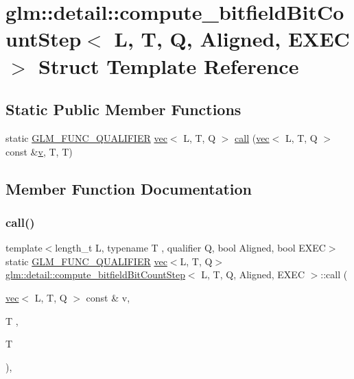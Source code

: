 \hypertarget{structglm_1_1detail_1_1compute__bitfield_bit_count_step}{}\section{glm\+:\+:detail\+:\+:compute\+\_\+bitfield\+Bit\+Count\+Step$<$ L, T, Q, Aligned, E\+X\+EC $>$ Struct Template Reference}
\label{structglm_1_1detail_1_1compute__bitfield_bit_count_step}
\subsection*{Static Public Member Functions}
\begin{DoxyCompactItemize}
\item 
static \hyperlink{setup_8hpp_a33fdea6f91c5f834105f7415e2a64407}{G\+L\+M\+\_\+\+F\+U\+N\+C\+\_\+\+Q\+U\+A\+L\+I\+F\+I\+ER} \hyperlink{structglm_1_1vec}{vec}$<$ L, T, Q $>$ \hyperlink{structglm_1_1detail_1_1compute__bitfield_bit_count_step_a6dd989f9de4e8dbe2af6cf3cae352778}{call} (\hyperlink{structglm_1_1vec}{vec}$<$ L, T, Q $>$ const \&\hyperlink{_s_d_l__opengl_8h_a10a82eabcb59d2fcd74acee063775f90}{v}, T, T)
\end{DoxyCompactItemize}


\subsection{Member Function Documentation}
\mbox{\label{structglm_1_1detail_1_1compute__bitfield_bit_count_step_a6dd989f9de4e8dbe2af6cf3cae352778}} 
\subsubsection{\texorpdfstring{call()}{call()}}
{\footnotesize\ttfamily template$<$length\+\_\+t L, typename T , qualifier Q, bool Aligned, bool E\+X\+EC$>$ \\
static \hyperlink{setup_8hpp_a33fdea6f91c5f834105f7415e2a64407}{G\+L\+M\+\_\+\+F\+U\+N\+C\+\_\+\+Q\+U\+A\+L\+I\+F\+I\+ER} \hyperlink{structglm_1_1vec}{vec}$<$L, T, Q$>$ \hyperlink{structglm_1_1detail_1_1compute__bitfield_bit_count_step}{glm\+::detail\+::compute\+\_\+bitfield\+Bit\+Count\+Step}$<$ L, T, Q, Aligned, E\+X\+EC $>$\+::call (\begin{DoxyParamCaption}\item[{\hyperlink{structglm_1_1vec}{vec}$<$ L, T, Q $>$ const \&}]{v,  }\item[{T}]{,  }\item[{T}]{ }\end{DoxyParamCaption})\hspace{0.3cm}{\ttfamily [inline]}, {\ttfamily [static]}}



